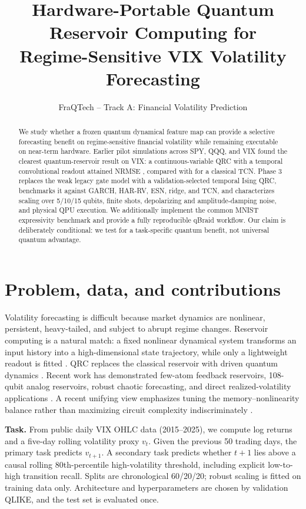 \documentclass[11pt]{article}
\title{\vspace{-1.4em}\textbf{Hardware-Portable Quantum Reservoir Computing for\\Regime-Sensitive VIX Volatility Forecasting}\vspace{-0.5em}}
\author{FraQTech -- Track A: Financial Volatility Prediction}
\date{}
\begin{document}
\maketitle
\vspace{-1.3em}
\begin{abstract}
We study whether a frozen quantum dynamical feature map can provide a selective forecasting benefit on regime-sensitive financial volatility while remaining executable on near-term hardware. Earlier pilot simulations across SPY, QQQ, and VIX found the clearest quantum-reservoir result on VIX: a continuous-variable QRC with a temporal convolutional readout attained NRMSE \PilotQRCNRMSE, compared with \PilotTCNNRMSE for a classical TCN. Phase 3 replaces the weak legacy gate model with a validation-selected temporal Ising QRC, benchmarks it against GARCH, HAR-RV, ESN, ridge, and TCN, and characterizes scaling over 5/10/15 qubits, finite shots, depolarizing and amplitude-damping noise, and physical QPU execution. We additionally implement the common MNIST expressivity benchmark and provide a fully reproducible qBraid workflow. Our claim is deliberately conditional: we test for a task-specific quantum benefit, not universal quantum advantage.
\end{abstract}

\section{Problem, data, and contributions}
Volatility forecasting is difficult because market dynamics are nonlinear, persistent, heavy-tailed, and subject to abrupt regime changes. Reservoir computing is a natural match: a fixed nonlinear dynamical system transforms an input history into a high-dimensional state trajectory, while only a lightweight readout is fitted \cite{jaeger2001echo}. QRC replaces the classical reservoir with driven quantum dynamics \cite{fujii2017harnessing,nakajima2019boosting}. Recent work has demonstrated few-atom feedback reservoirs, 108-qubit analog reservoirs, robust chaotic forecasting, and direct realized-volatility applications \cite{kornjaca2024large,zhu2025practical,ahmed2025robust,li2025volatility}. A recent unifying view emphasizes tuning the memory--nonlinearity balance rather than maximizing circuit complexity indiscriminately \cite{cindrak2026tradeoff}.

\textbf{Task.} From public daily VIX OHLC data (2015--2025), we compute log returns and a five-day rolling volatility proxy $v_t$. Given the previous 50 trading days, the primary task predicts $v_{t+1}$. A secondary task predicts whether $t+1$ lies above a causal rolling 80th-percentile high-volatility threshold, including explicit low-to-high transition recall. Splits are chronological 60/20/20; robust scaling is fitted on training data only. Architecture and hyperparameters are chosen by validation QLIKE, and the test set is evaluated once.
\end{document}
